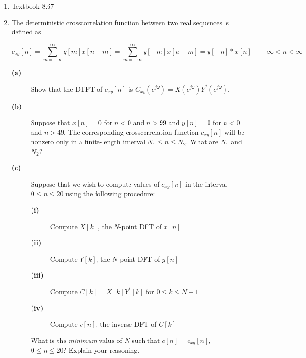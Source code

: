 \documentclass[11pt]{article}
\begin{document}
\begin{enumerate}
\vspace{5mm} 
\item Textbook 8.67 %

\vspace{5mm} 
\item The deterministic crosscorrelation function between two real sequences is defined as

\[
c_{xy}[n]=\sum_{m=-\infty}^\infty y[m]x[n+m] = \sum_{m=-\infty}^\infty y[-m]x[n-m]=y[-n]*x[n]\quad -\infty < n < \infty
\]

\begin{description}
\item[\textbf{(a)}] Show that the DTFT of $c_{xy}[n]$ is $C_{xy}(e^{j\omega}) = X(e^{j\omega})Y^*(e^{j\omega})$.
\item[\textbf{(b)}] Suppose that $x[n] = 0$ for $n < 0$ and $n > 99$ and $y[n]=0$ for $n < 0$ and $n > 49$. The corresponding crosscorrelation function $c_{xy}[n]$ will be nonzero only in a finite-length interval $N_1 \leq n \leq N_2$. What are $N_1$ and $N_2$?
\item[\textbf{(c)}] Suppose that we wish to compute values of $c_{xy}[n]$ in the interval $0 \leq n \leq 20$ using the following procedure:
\begin{description}
\item[\textbf{(i)}] Compute $X[k]$, the $N$-point DFT of $x[n]$
\item[\textbf{(ii)}] Compute $Y[k]$, the $N$-point DFT of $y[n]$
\item[\textbf{(iii)}] Compute $C[k]=X[k]Y^*[k]$ for $0 \leq k \leq N - 1$
\item[\textbf{(iv)}] Compute $c[n]$, the inverse DFT of $C[k]$
\end{description}
What is the \textit{minimum} value of $N$ such that $c[n] = c_{xy}[n]$, \\$0 \leq n \leq 20$? Explain your reasoning.
\end{description}


\end{enumerate}
\end{document}
